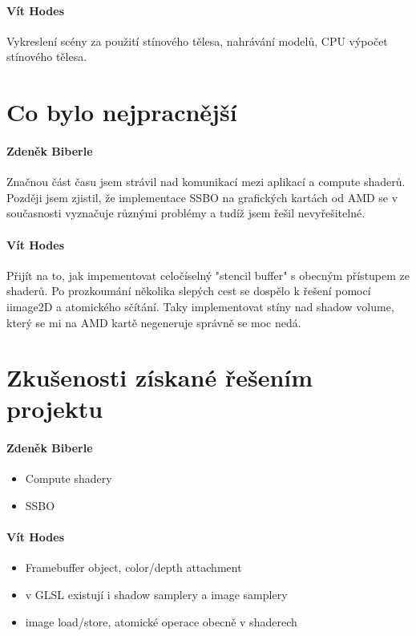 \documentclass[11pt,a4paper]{article}
\begin{document}
\paragraph{Vít Hodes} Vykreslení scény za použití stínového tělesa, nahrávání modelů, CPU výpočet stínového tělesa.

\section{Co bylo nejpracnější}

\paragraph{Zdeněk Biberle}
Značnou část času jsem strávil nad komunikací mezi aplikací a compute shaderů. Později jsem zjistil, že implementace SSBO na grafických kartách od AMD se v současnosti vyznačuje různými problémy a tudíž jsem řešil nevyřešitelné.

\paragraph{Vít Hodes} Přijít na to, jak impementovat celočíselný "stencil buffer" s obecným přístupem ze shaderů. Po prozkoumání několika slepých cest se dospělo k řešení pomocí iimage2D a atomického sčítání. Taky implementovat stíny nad shadow volume, který se mi na AMD kartě negeneruje správně se moc nedá.

\section{Zkušenosti získané řešením projektu}

\paragraph{Zdeněk Biberle}
\begin{itemize}
	\item Compute shadery
	\item SSBO
\end{itemize}

\paragraph{Vít Hodes}
\begin{itemize}
	\item Framebuffer object, color/depth attachment
	\item v GLSL existují i shadow samplery a image samplery
	\item image load/store, atomické operace obecně v shaderech
	
\end{itemize}
\end{document}
